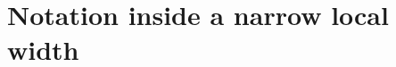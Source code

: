 \documentclass{article}
\begin{document}
\section*{Notation inside a narrow local width}
\noindent\begin{minipage}{.55\linewidth}

\end{minipage}
\end{document}
